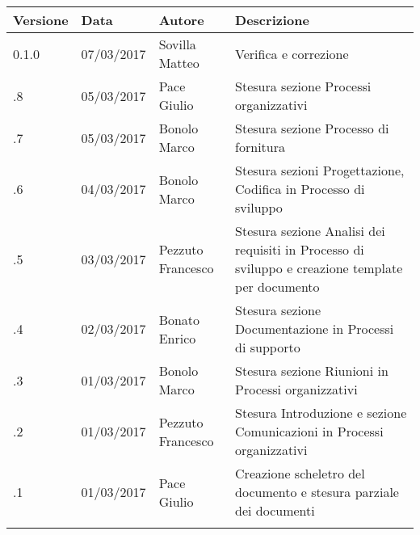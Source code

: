 	\newpage
		\begin{longtabu} to \textwidth {
				X[4,l,p]
				X[4,l,p]
				X[4,l,p]
				X[8,l,p]}
			\toprule
			 Versione & Data & Autore & Descrizione \\
			\midrule
			\endhead
0.1.0 & 07/03/2017 & Sovilla Matteo & Verifica e correzione\\
\addlinespace[0.2em]
\midrule
{}.8 & 05/03/2017 & Pace Giulio & Stesura sezione Processi organizzativi\\
\addlinespace[0.2em]
\midrule
{}.7 & 05/03/2017 & Bonolo Marco & Stesura sezione Processo di fornitura\\
\addlinespace[0.2em]
\midrule
{}.6 & 04/03/2017 & Bonolo Marco & Stesura sezioni Progettazione, Codifica in Processo di sviluppo\\
\addlinespace[0.2em]
\midrule
{}.5 & 03/03/2017 & Pezzuto Francesco & Stesura sezione Analisi dei requisiti in Processo di sviluppo e creazione template per documento\\
		\addlinespace[0.2em]
		\midrule
		.4 & 02/03/2017 & Bonato Enrico & Stesura sezione Documentazione in Processi di supporto\\
		\addlinespace[0.2em]
		\midrule
		.3 & 01/03/2017 & Bonolo Marco & Stesura sezione Riunioni in Processi organizzativi\\
		\addlinespace[0.2em]
		\midrule
		.2 & 01/03/2017 & Pezzuto Francesco & Stesura Introduzione e sezione Comunicazioni in Processi organizzativi\\
		\addlinespace[0.2em]
		\midrule
		.1 & 01/03/2017 & Pace Giulio & Creazione scheletro del documento e stesura parziale dei documenti\\
		\addlinespace[0.4em]
		\bottomrule
	\end{longtabu}
